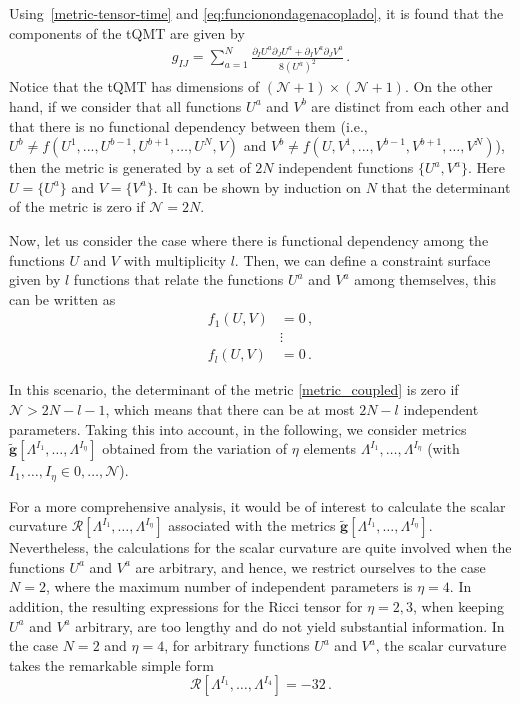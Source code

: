\documentclass[12pt]{iopart}
\begin{document}
Using~\eqref{metric-tensor-time} and \eqref{eq:funcionondagenacoplado}, it is found that the components of the tQMT are given by
\begin{align}\label{metric_coupled}
g_{IJ}=\sum_{a=1}^N\frac{\partial_{I}U^{a}\partial_{J}U^{a}+\partial_{I}V^{a}\partial_{J}V^{a}}{8(U^{a})^2}\,.
\end{align}
Notice that the tQMT has dimensions of $( \mathcal{N}+1 )\times ( \mathcal{N}+1 )$. On the other hand, if we \break consider that all functions $U^a$ and $V^b$ are distinct from each other and that there is no \break functional dependency between them (i.e., $U^b\neq f(U^1,..., U^{b-1}, U^{b+1},\dots, U^N, V)$ and \break $V^b\neq f(U, V^1,..., V^{b-1}, V^{b+1},\dots, V^N)$), then the metric is generated by a set of $2N$ independent functions $\{ U^a, V^a \}$. Here $U= \{ U^a\}$ and $V= \{ V^a\}$. It can be shown by induction on $N$ that the determinant of the metric is zero if $\mathcal{N}=2N$. 

Now, let us consider the case where there is functional dependency among the functions $U$ and $V$ with multiplicity $l$. Then, we can define a constraint surface given by $l$ functions that relate the functions $U^a$ and $V^a$ among themselves, this can be written as
\begin{align}
    f_1(U,V)&=0\,,\nonumber\\
    &\vdots\nonumber \\
    f_{l}(U,V)&=0 \,.
\end{align}

In this scenario, the determinant of the metric \eqref{metric_coupled} is zero if $\mathcal{N}>2N-l-1$, which means that there can be at most $2N-l$ independent parameters. Taking this into account, in the following, we consider metrics $\tilde{\boldsymbol{g}}[\Lambda^{\scriptscriptstyle I_1},\dots,\Lambda^{\scriptscriptstyle I_{\eta}}]$ obtained from the variation of $\eta$ elements $\Lambda^{\scriptscriptstyle I_1},\dots,\Lambda^{I_{\scriptscriptstyle \eta}}$ (with $I_1,\dots, I_{\eta}\in { 0,\dots, \mathcal{N} }$). 

For a more comprehensive analysis, it would be of interest to calculate the scalar curvature $\mathcal{R} [\Lambda^{I_1},\dots,\Lambda^{I_{\eta}}]$ associated with the metrics $\tilde{\boldsymbol{g}}[\Lambda^{\scriptscriptstyle I_1},\dots,\Lambda^{\scriptscriptstyle I_{\eta}}]$. Nevertheless, the calculations for the scalar curvature are quite involved when the functions $U^a$ and $V^a$ are arbitrary, and hence, we restrict ourselves to the case $N=2$, where the maximum number of independent parameters is $\eta=4$. In addition, the resulting expressions for the Ricci tensor for $\eta=2,3$, when keeping $U^a$ and $V^a$ arbitrary, are too lengthy and do not yield substantial information. In the case $N=2$ and $\eta=4$, for arbitrary functions $U^a$ and $V^a$, the scalar curvature takes the remarkable simple form 
\begin{equation}
\mathcal{R}[\Lambda^{I_1},\dots,\Lambda^{I_{4}}]=-32\,.
\end{equation}
\end{document}
